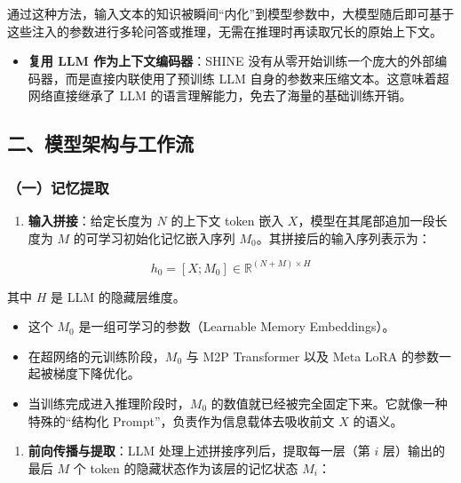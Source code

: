 通过这种方法，输入文本的知识被瞬间``内化''到模型参数中，大模型随后即可基于这些注入的参数进行多轮问答或推理，无需在推理时再读取冗长的原始上下文。

\begin{itemize}
\tightlist
\item
  \textbf{复用 LLM 作为上下文编码器}：SHINE 没有从零开始训练一个庞大的外部编码器，而是直接内联使用了预训练 LLM 自身的参数来压缩文本。这意味着超网络直接继承了 LLM 的语言理解能力，免去了海量的基础训练开销。
\end{itemize}

\hypertarget{ux4e8cux6a21ux578bux67b6ux6784ux4e0eux5de5ux4f5cux6d41}{%
\subsection{二、模型架构与工作流}\label{ux4e8cux6a21ux578bux67b6ux6784ux4e0eux5de5ux4f5cux6d41}}

\hypertarget{ux4e00ux8bb0ux5fc6ux63d0ux53d6}{%
\subsubsection{（一）记忆提取}\label{ux4e00ux8bb0ux5fc6ux63d0ux53d6}}

\begin{enumerate}
\def\labelenumi{\arabic{enumi}.}
\tightlist
\item
  \textbf{输入拼接}：给定长度为 \(N\) 的上下文 token 嵌入 \(X\)，模型在其尾部追加一段长度为 \(M\) 的可学习初始化记忆嵌入序列 \(M_0\)。其拼接后的输入序列表示为：
\end{enumerate}

\[
h_0 = [X;M_0]\in\mathbb{R}^{(N+M)\times H}
\]

其中 \(H\) 是 LLM 的隐藏层维度。

\begin{itemize}
\tightlist
\item
  这个 \(M_0\) 是一组可学习的参数（Learnable Memory Embeddings）。
\item
  在超网络的元训练阶段，\(M_0\) 与 M2P Transformer 以及 Meta LoRA 的参数一起被梯度下降优化。
\item
  当训练完成进入推理阶段时，\(M_0\) 的数值就已经被完全固定下来。它就像一种特殊的``结构化 Prompt''，负责作为信息载体去吸收前文 \(X\) 的语义。
\end{itemize}

\begin{enumerate}
\def\labelenumi{\arabic{enumi}.}
\setcounter{enumi}{1}
\tightlist
\item
  \textbf{前向传播与提取}：LLM 处理上述拼接序列后，提取每一层（第 \(i\) 层）输出的最后 \(M\) 个 token 的隐藏状态作为该层的记忆状态 \(M_i\)：
\end{enumerate}

